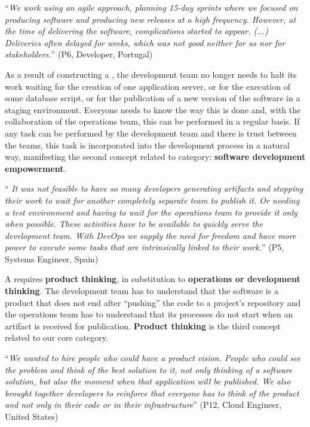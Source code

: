 \begin{mq}
``\emph{We work using an agile approach, planning 15-day sprints where we focused on
producing software and producing new releases at a high frequency. However, at the time of
delivering the software, complications started to appear. (...) Deliveries often
delayed for weeks, which was not good neither for us nor for stakeholders.}''
(P6, Developer, Portugal)
\end{mq}

As a result of constructing a \cc, the development
team no longer needs to halt its work waiting for the creation
of one application server, or for the execution of some database script, or for
the publication of a new version of the software in a staging environment.
Everyone needs to know the way this is done and, with the collaboration of the
operations team, this can be performed in a regular basis. If any task can be
performed by the development team and there is trust between the teams, this task is
incorporated into the development process in a natural way, manifesting the
second concept related to \cc category: \textbf{software
development empowerment}.

\begin{mq}
``\emph{
It was not feasible to have so many developers generating artifacts and
stopping their work to wait for another completely separate team to publish it. Or
needing a test environment and having to wait for the operations team to
provide it only when possible. These activities have to be available to quickly
serve the development team. With DevOps we supply the need for freedom and
have more power to execute some tasks that are intrinsically linked to their work.}''
(P5, Systems Engineer, Spain)
\end{mq}

A \cc requires  \textbf{product thinking}, in substitution to
\textbf{operations or development thinking}. The development team has to understand that
the software is a product that does not end after ``pushing'' the code to a
project's repository and the operations team has to understand that its
processes do not start when an artifact is received for publication. \textbf{Product thinking}
is the third concept related to our core category.

\begin{mq}
``\emph{We wanted to
hire people who could have a product vision. People who could see the
problem and think of the best solution to it, not only thinking of a
software solution, but also the moment when that application will be
published. We also brought together developers to reinforce that everyone
has to think of the product and not only in their code or in their
infrastructure}'' (P12, Cloud Engineer, United States)
\end{mq}

